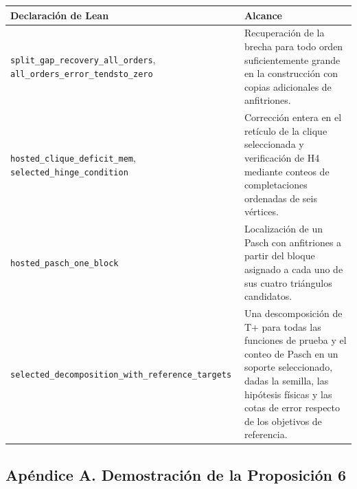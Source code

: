 \documentclass[spanish,11pt,a4paper]{article}
\newcounter{none}
\begin{document}
{\def\LTcaptype{none} %
\begin{longtable}[]{@{}
  >{\raggedright\arraybackslash}p{}
  >{\raggedright\arraybackslash}p{}@{}}
\toprule\noalign{}
\begin{minipage}[b]{\linewidth}\raggedright
Declaración de Lean
\end{minipage} & \begin{minipage}[b]{\linewidth}\raggedright
Alcance
\end{minipage} \\
\midrule\noalign{}
\endhead
\bottomrule\noalign{}
\endlastfoot
\nolinkurl{split_gap_recovery_all_orders}, \nolinkurl{all_orders_error_tendsto_zero} & Recuperación de la brecha para todo orden suficientemente grande en la construcción con copias adicionales de anfitriones. \\
\nolinkurl{hosted_clique_deficit_mem}, \nolinkurl{selected_hinge_condition} & Corrección entera en el retículo de la clique seleccionada y verificación de H4 mediante conteos de completaciones ordenadas de seis vértices. \\
\nolinkurl{hosted_pasch_one_block} & Localización de un Pasch con anfitriones a partir del bloque asignado a cada uno de sus cuatro triángulos candidatos. \\
\nolinkurl{selected_decomposition_with_reference_targets} & Una descomposición de T+ para todas las funciones de prueba y el conteo de Pasch en un soporte seleccionado, dadas la semilla, las hipótesis físicas y las cotas de error respecto de los objetivos de referencia. \\
\end{longtable}
}

\subsection{Apéndice A. Demostración de la Proposición 6}\label{apuxe9ndice-a.-demostraciuxf3n-de-la-proposiciuxf3n-6}
\end{document}
